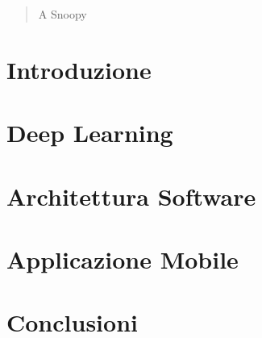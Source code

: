 \documentclass[12pt]{report}
\newenvironment{dedication}
{\vspace*{50ex}\begin{quotation}\begin{center}\begin{em}}
      {\par\end{em}\end{center}\end{quotation}}
\begin{document}
\begin{abstract}
  
\end{abstract}

\clearpage
\begin{dedication}
    \thispagestyle{empty}
  A Snoopy
\end{dedication}
\clearpage
{}

\tableofcontents

\chapter{Introduzione}


\chapter{Deep Learning}


\chapter{Architettura Software}\label{cap:architecture}


\chapter{Applicazione Mobile}


\chapter{Conclusioni}


\appendix%



\printbibliography%
\end{document}
